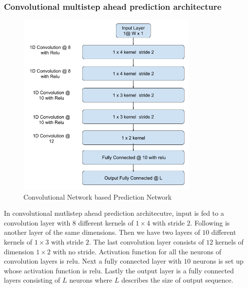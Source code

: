 \documentclass[12pt]{article}
\begin{document}
\subsubsection{Convolutional multistep ahead prediction architecture}
\begin{figure}[H]
\centering
        \includegraphics[width=0.8\textwidth]{images/architecture/CnnMultistepPrediction.png}
    \caption{Convolutional Network based Prediction Network}
    \label{generalAnomalyDetectionFrameWork}
\end{figure}

In convolutional mutlistep ahead prediction architecutre, input is fed to a convolution layer with $8$ different kernels of $1 \times 4$ with stride $2$. Following is another layer of the same dimensions. Then we have two layers of $10$ different kernels of $1 \times 3$ with stride $2$. The last convolution layer consists of $12$ kernels of dimension $1 \times 2$ with no stride. Activation function for all the neurons of convolution layers is relu. Next a fully connected layer with $10$ neurons is set up whose activation function is relu. Lastly the output layer is a fully connected layers consisting of $L$ neurons where $L$ describes the size of output sequence.
\end{document}
